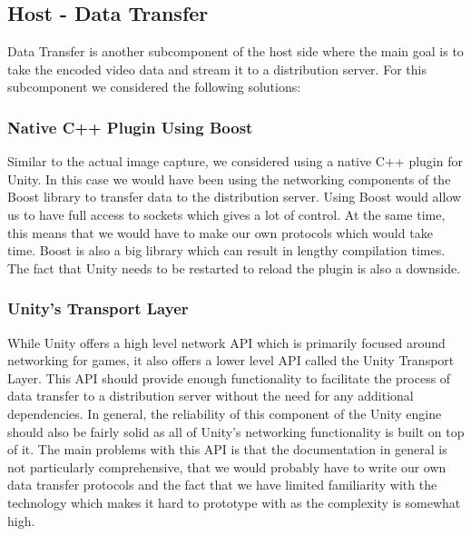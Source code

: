 \subsection{Host - Data Transfer} %
Data Transfer is another subcomponent of the host side where the main goal is to take the encoded video data and stream it to a distribution server. For this subcomponent we considered the following solutions:

\subsubsection{Native C++ Plugin Using Boost}
Similar to the actual image capture, we considered using a native C++ plugin for Unity. In this case we would have been using the networking components of the Boost library\cite{boost} to transfer data to the distribution server. Using Boost would allow us to have full access to sockets which gives a lot of control. At the same time, this means that we would have to make our own protocols which would take time. Boost is also a big library which can result in lengthy compilation times. The fact that Unity needs to be restarted to reload the plugin is also a downside. 

\subsubsection{Unity's Transport Layer}
While Unity offers a high level network API which is primarily focused around networking for games, it also offers a lower level API called the Unity Transport Layer\cite{unity_transportLayer}. This API should provide enough functionality to facilitate the process of data transfer to a distribution server without the need for any additional dependencies. In general, the reliability of this component of the Unity engine should also be fairly solid as all of Unity's networking functionality is built on top of it. The main problems with this API is that the documentation in general is not particularly comprehensive, that we would probably have to write our own data transfer protocols and the fact that we have limited familiarity with the technology which makes it hard to prototype with as the complexity is somewhat high. 

